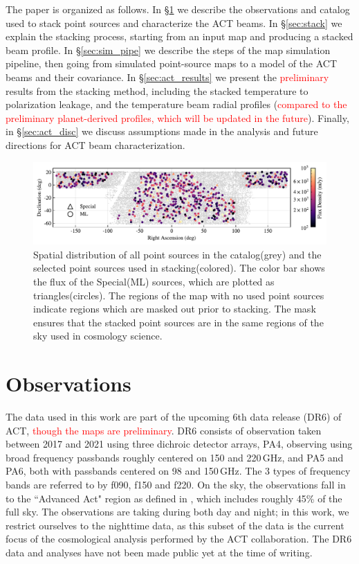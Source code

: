 The paper is organized as follows.  In \S\ref{sec:observations} we describe the observations and catalog used to stack point sources and characterize the ACT beams.  In \S\ref{sec:stack} we explain the stacking process, starting from an input map and producing a stacked beam profile.  In \S\ref{sec:sim_pipe} we describe the steps of the map simulation pipeline, then going from simulated point-source maps to a model of the ACT beams and their covariance.  In \S\ref{sec:act_results} we present the \textcolor{red}{preliminary} results from the stacking method, including the stacked temperature to polarization leakage, and the temperature beam radial profiles (\textcolor{red}{compared to the preliminary planet-derived profiles, which will be updated in the future}).  Finally, in \S\ref{sec:act_disc} we discuss assumptions made in the analysis and future directions for ACT beam characterization.

\begin{figure}[t]
    \centering
    \includegraphics[width = \textwidth]{Figures/flux_map.pdf}
    \caption{Spatial distribution of all point sources in the catalog(grey) and the selected point sources used in stacking(colored).  The color bar shows the flux of the Special(ML) sources, which are plotted as triangles(circles).  The regions of the map with no used point sources indicate regions which are masked out prior to stacking.  The mask ensures that the stacked point sources are in the same regions of the sky used in cosmology science.}
    \label{fig:ptsrc_map}
\end{figure}

\section{Observations}
\label{sec:observations}
The  data used in this work are part of the upcoming 6th data release (DR6) of ACT, \textcolor{red}{though the maps are preliminary}. DR6 consists of observation taken between 2017 and 2021 using three dichroic detector arrays, PA4, observing using broad frequency passbands roughly centered on  150 and 220\,GHz, and PA5 and PA6, both with passbands centered on 98 and 150\,GHz. The 3 types of frequency bands are referred to by f090, f150 and f220. On the sky, the observations fall in to the ``Advanced Act" region as defined in \cite{aiola_2020}, which includes roughly 45\% of the full sky. The observations are taking during both day and night; in this work, we restrict ourselves to the nighttime data, as this subset of the data is the current focus of the cosmological analysis performed by the ACT collaboration. The DR6 data and analyses have not been made public yet at the time of writing.

